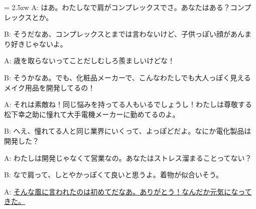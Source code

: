 \documentclass[11pt]{amsart}
\title{}
\author{}
\newenvironment{hangall}[1]{\hangindent = 2.5zw\everypar{\hangindent = 2.5zw}}{}
\begin{document}
\maketitle
\begin{hangall}{}%
A: はあ。わたしなで肩がコンプレックスでさ。あなたはある？コンプレックスとか。

B: そうだなあ、コンプレックスとまでは言わないけど、子供っぽい顔があんまり好きじゃないよ。

A: 歳を取らないってことだしむしろ羨ましいけどな！

B: そうかなあ。でも、化粧品メーカーで、こんなわたしでも大人っぽく見えるメイク用品を開発してるの！

A: それは素敵ね！同じ悩みを持ってる人もいるでしょうし！わたしは尊敬する松下幸之助に憧れて大手電機メーカーに勤めてるのよ。

B: へえ、憧れてる人と同じ業界にいくって、よっぽどだよ。なにか電化製品は開発した？

A: わたしは開発じゃなくて営業なの。あなたはストレス溜まることってない？

B: なで肩って、しとやかっぽくて良いと思うよ。着物が似合いそう。

A: \ul{そんな風に言われたのは初めてだなあ。ありがとう！なんだか元気になってきた。}\end{hangall}
\end{document}
